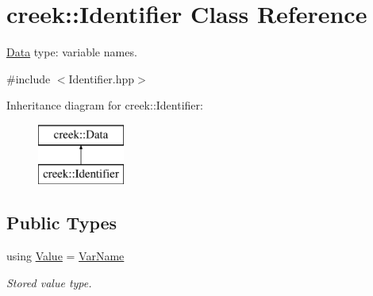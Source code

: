 \hypertarget{classcreek_1_1_identifier}{}\section{creek\+:\+:Identifier Class Reference}
\label{classcreek_1_1_identifier}


\hyperlink{classcreek_1_1_data}{Data} type\+: variable names.  




{\ttfamily \#include $<$Identifier.\+hpp$>$}

Inheritance diagram for creek\+:\+:Identifier\+:\begin{figure}[H]
\begin{center}
\leavevmode
\includegraphics[height=2.000000cm]{classcreek_1_1_identifier}
\end{center}
\end{figure}
\subsection*{Public Types}
\begin{DoxyCompactItemize}
\item 
using \hyperlink{classcreek_1_1_identifier_afb560a4cce99e96c30092edbd22a5ef4}{Value} = \hyperlink{classcreek_1_1_var_name}{Var\+Name}\hypertarget{classcreek_1_1_identifier_afb560a4cce99e96c30092edbd22a5ef4}{}\label{classcreek_1_1_identifier_afb560a4cce99e96c30092edbd22a5ef4}

\begin{DoxyCompactList}\small\item\em Stored value type. \end{DoxyCompactList}\end{DoxyCompactItemize}
